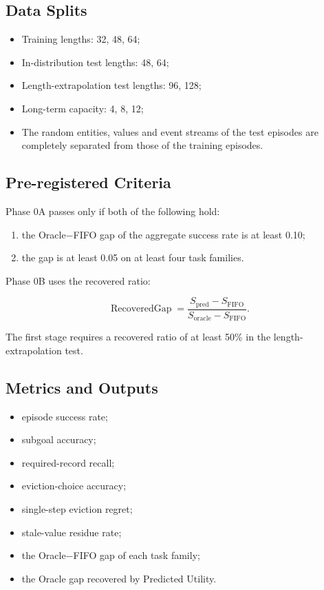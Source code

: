 \subsection{Data Splits}

\begin{itemize}
  \item Training lengths: 32, 48, 64;
  \item In-distribution test lengths: 48, 64;
  \item Length-extrapolation test lengths: 96, 128;
  \item Long-term capacity: 4, 8, 12;
  \item The random entities, values and event streams of the test episodes are completely separated from those of the training episodes.
\end{itemize}

\subsection{Pre-registered Criteria}

Phase 0A passes only if both of the following hold:

\begin{enumerate}
  \item the Oracle$-$FIFO gap of the aggregate success rate is at least 0.10;
  \item the gap is at least 0.05 on at least four task families.
\end{enumerate}

Phase 0B uses the recovered ratio:

\[
\operatorname{RecoveredGap}
=
\frac{S_{\mathrm{pred}}-S_{\mathrm{FIFO}}}
{S_{\mathrm{oracle}}-S_{\mathrm{FIFO}}}.
\]

The first stage requires a recovered ratio of at least 50\% in the length-extrapolation test.

\subsection{Metrics and Outputs}

\begin{itemize}
  \item episode success rate;
  \item subgoal accuracy;
  \item required-record recall;
  \item eviction-choice accuracy;
  \item single-step eviction regret;
  \item stale-value residue rate;
  \item the Oracle$-$FIFO gap of each task family;
  \item the Oracle gap recovered by Predicted Utility.
\end{itemize}

